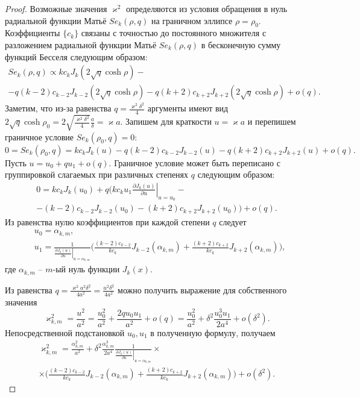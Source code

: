 \begin{proof}
Возможные значения $\varkappa^2$ определяются из условия обращения в нуль радиальной функции Матьё $Se_k(\rho, q)$ на граничном эллипсе $\rho = \rho_0$.
Коэффициенты $\{c_k\}$ связаны \cite{wref2} с точностью до постоянного множителя с разложением радиальной функции Матьё $Se_k(\rho, q)$ в бесконечную сумму функций Бесселя следующим образом:
\begin{multline*}
Se_k(\rho, q) \propto 
	k c_k J_k(2\sqrt{q}\cosh{\rho}) - \\
	- q (k-2) c_{k-2} J_{k-2}(2\sqrt{q}\cosh{\rho}) -
	q (k+2) c_{k+2} J_{k+2}(2\sqrt{q}\cosh{\rho}) + o(q).
\end{multline*}
Заметим, что из-за равенства $q = \frac{\varkappa^2\delta^2}{4}$ аргументы имеют вид $2 \sqrt{q} \cosh{\rho_0} = 2 \sqrt{\frac{\varkappa^2 \delta^2}{4}} \frac{a}{\delta} = \varkappa a$. 
Запишем для краткости $u = \varkappa a$ и перепишем граничное условие $Se_k(\rho_0, q) = 0$:
$$0 = Se_k(\rho_0, q) =
	k c_k J_k(u) 
	- q (k-2) c_{k-2} J_{k-2}(u) -
	q (k+2) c_{k+2} J_{k+2}(u) + o(q).$$
Пусть $u = u_0 + q u_1 + o(q)$. Граничное условие может быть переписано с группировкой слагаемых при различных степенях $q$ следующим образом:
\begin{multline*}
0 =
	k c_k J_k(u_0) + q \biggl(
	k c_k u_1 \left.\frac{\partial  J_k(u)}{\partial u}\right|_{u=u_0} -\\
	-  (k-2) c_{k-2} J_{k-2}(u_0) - (k+2) c_{k+2} J_{k+2}(u_0) 
	\biggr)+ o(q).
\end{multline*}
Из равенства нулю коэффициентов при каждой степени $q$ следует
\begin{align*}
&u_0 = \alpha_{k, m}, \\
&u_1 = \frac{1}{\left.\frac{\partial J_{k} (u)}{\partial u}\right|_{u=\alpha_{k, m}}} 
\biggl(
\frac{(k-2)c_{k-2}}{k c_k} J_{k-2}(\alpha_{k, m}) + \frac{(k+2)c_{k+2} }{k c_k} J_{k+2}(\alpha_{k, m})
\biggr),
\end{align*}
где $\alpha_{k, m}$ -- $m$-ый нуль функции $J_k(x)$.  

Из равенства $q=\frac{\varkappa^2 a^2 \delta^2}{4 a^2}=\frac{u^2 \delta^2}{4a^2}$ можно получить выражение для собственного значения
$$\varkappa_{k, m}^2 = \frac{u^2}{a^2} = \frac{u_0^2}{a^2} + \frac{2 q u_0 u_1}{a^2} + o(q)= \frac{u_0^2}{a^2} +  \delta^2 \frac{u_0^3 u_1}{2 a^4} + o(\delta^2).$$ 
Непосредственной подстановкой $u_0, u_1$ в полученную формулу, получаем
\begin{multline*}
\varkappa_{k, m}^2 = 
\frac{\alpha_{k, m}^2}{a^2} +  \delta^2 \frac{\alpha_{k, m}^3}{2 a^4}\frac{1}{\left.\frac{\partial J_{k} (u)}{\partial u}\right|_{u=\alpha_{k, m}}} \times \\ \times
\biggl(
\frac{(k-2)c_{k-2}}{k c_k} J_{k-2}(\alpha_{k, m}) + \frac{(k+2)c_{k+2} }{k c_k} J_{k+2}(\alpha_{k, m})
\biggr) + o(\delta^2).
\end{multline*}
\end{proof}

